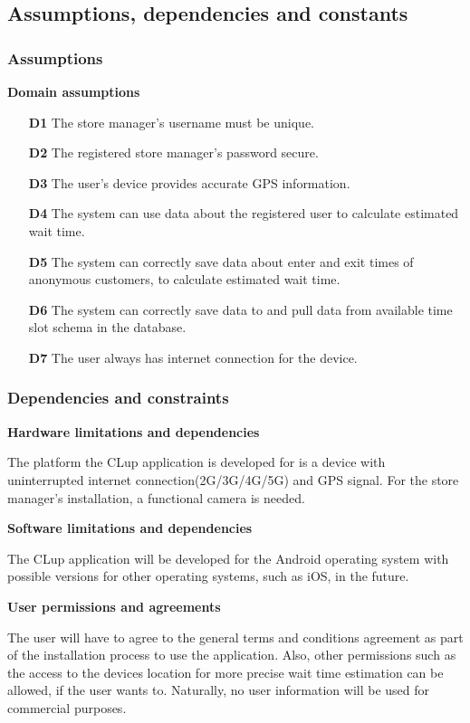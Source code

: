 \newpage

\subsection{Assumptions, dependencies and constants}
\subsubsection{Assumptions}
\textbf{Domain assumptions}

\begin{itemize}
	\item[\textbf{D1}]The store manager's username must be unique. 
	\item[\textbf{D2}]The registered store manager's password secure. 
	\item[\textbf{D3}]The user's device provides accurate GPS information. 
	\item[\textbf{D4}]The system can use data about the registered user to calculate estimated wait time.
	\item[\textbf{D5}]The system can correctly save data about enter and exit times of anonymous customers, to calculate estimated wait time. 
	\item[\textbf{D6}]The system can correctly save data to and pull data from available time slot schema in the database.
	\item[\textbf{D7}]The user always has internet connection for the device.
\end{itemize}

\subsubsection{Dependencies and constraints}
\hspace{\parindent}\textbf{Hardware limitations and dependencies}

\hspace{\parindent}The platform the CLup application is developed for is a device with uninterrupted internet connection(2G/3G/4G/5G) and GPS signal. For the store manager's installation, a functional camera is needed. \break

\textbf{Software limitations and dependencies}

\hspace{\parindent}The CLup application will be developed for the Android operating system with possible versions for other operating systems, such as iOS, in the future. \break

\textbf{User permissions and agreements}

\hspace{\parindent}The user will have to agree to the general terms and conditions agreement as part of the installation process to use the application. Also, other permissions such as the access to the devices location for more precise wait time estimation can be allowed, if the user wants to. Naturally, no user information will be used for commercial purposes. 


